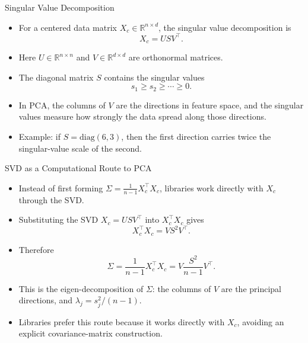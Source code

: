 \begin{frame}{Singular Value Decomposition}
\begin{itemize}
  \item For a centered data matrix $X_c \in \mathbb{R}^{n\times d}$, the singular value decomposition is
  \begin{equation}
    X_c = U S V^\top.
    \label{eq:svd-pca}
  \end{equation}
  \pause
  \item Here $U \in \mathbb{R}^{n\times n}$ and $V \in \mathbb{R}^{d\times d}$ are orthonormal matrices.
  \pause
  \item The diagonal matrix $S$ contains the singular values
  \[
    s_1 \ge s_2 \ge \cdots \ge 0.
  \]
  \pause
  \item In PCA, the columns of $V$ are the directions in feature space, and the singular values measure how strongly the data spread along those directions.
  \pause
  \item \footnotesize Example: if $S=\mathrm{diag}(6,3)$, then the first direction carries twice the singular-value scale of the second.
\end{itemize}
\end{frame}

\begin{frame}{SVD as a Computational Route to PCA}
\begin{itemize}
  \item Instead of first forming $\Sigma = \frac{1}{n-1}X_c^\top X_c$, libraries work directly with $X_c$ through the SVD.
  \pause
  \item Substituting the SVD $X_c = USV^\top$ into $X_c^\top X_c$ gives
  \begin{equation}
    X_c^\top X_c = V S^2 V^\top.
    \label{eq:xtx}
  \end{equation}
  \pause
  \item Therefore
  \[
    \Sigma = \frac{1}{n-1}X_c^\top X_c = V \frac{S^2}{n-1} V^\top.
  \]
  \pause
  \item This is the eigen-decomposition of $\Sigma$: the columns of $V$ are the principal directions, and $\lambda_j = s_j^2/(n-1)$.
  \pause
  \item Libraries prefer this route because it works directly with $X_c$, avoiding an explicit covariance-matrix construction.
\end{itemize}
\end{frame}

